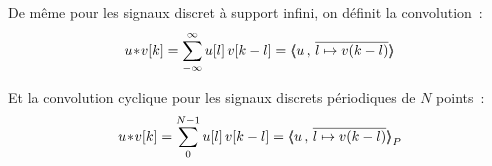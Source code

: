 De même pour les signaux discret à support infini, on définit la convolution~:
\begin{equation}
  \label{eq:convolution_discrete}
  u\!\ast\! v[k] = \sum\limits_{-\infty}^{\infty}{u[l]\,v[k-l]} = \langle\!\!\langle u\,,\,\overline{l\mapsto v(k-l)}\rangle\!\!\rangle
\end{equation}

Et la convolution cyclique pour les signaux discrets périodiques de $N$ points~:
\begin{equation}
  \label{eq:convolution_discrete}
  u\!\ast\! v[k] = \sum\limits_{0}^{N-1}{u[l]\,v[k-l]} = \langle\!\!\langle u\,,\,\overline{l\mapsto v(k-l)}{\rangle\!\!\rangle}_P
\end{equation}


